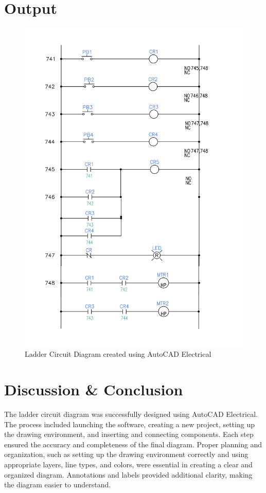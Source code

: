\documentclass[12pt]{article}
\begin{document}
\section*{Output}
\begin{figure}[H]
    \centering
    \includegraphics[width=.9\textwidth]{ladder.png}
    \caption{Ladder Circuit Diagram created using AutoCAD Electrical}
    \label{fig:ladder_circuit}
\end{figure}

\section*{Discussion \& Conclusion}
The ladder circuit diagram was successfully designed using AutoCAD Electrical. The process included launching the software, creating a new project, setting up the drawing environment, and inserting and connecting components. Each step ensured the accuracy and completeness of the final diagram. Proper planning and organization, such as setting up the drawing environment correctly and using appropriate layers, line types, and colors, were essential in creating a clear and organized diagram. Annotations and labels provided additional clarity, making the diagram easier to understand.

% 
% 
\end{document}
